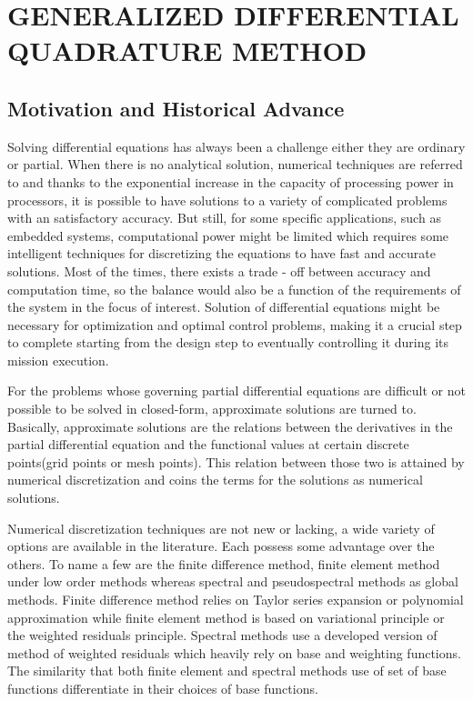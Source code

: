 \chapter{GENERALIZED DIFFERENTIAL QUADRATURE METHOD}\label{ch:fp}

\section{Motivation and Historical Advance}

Solving differential equations has always been a challenge either they are ordinary or partial. When there is no analytical solution, numerical techniques are referred to and thanks to the exponential increase in the capacity of processing power in processors, it is possible to have solutions to a variety of complicated problems with an satisfactory accuracy. But still, for some specific applications, such as embedded systems, computational power might be limited which requires some intelligent techniques for discretizing the equations to have fast and accurate solutions. Most of the times, there exists a trade - off between accuracy and computation time, so the balance would also be a function of the requirements of the system in the focus of interest. Solution of differential equations might be necessary for optimization and optimal control problems, making it a crucial step to complete starting from the design step to eventually controlling it during its mission execution.  

For the problems whose governing partial differential equations are difficult or not possible to be solved in closed-form, approximate solutions are turned to. Basically, approximate solutions are the relations between the derivatives in the partial differential equation and the functional values at certain discrete points(grid points or mesh points). This relation between those two is attained by numerical discretization and coins the terms for the solutions as numerical solutions.

Numerical discretization techniques are not new or lacking, a wide variety of options are available in the literature. Each possess some advantage over the others. To name a few are the finite difference method, finite element method under low order methods whereas spectral and pseudospectral methods as global methods. Finite difference method relies on Taylor series expansion or polynomial approximation while finite element method is based on variational principle or the weighted residuals principle. Spectral methods use a developed version of method of weighted residuals which heavily rely on base and weighting functions. The similarity that both finite element and spectral methods use of set of base functions differentiate in their choices of base functions.

